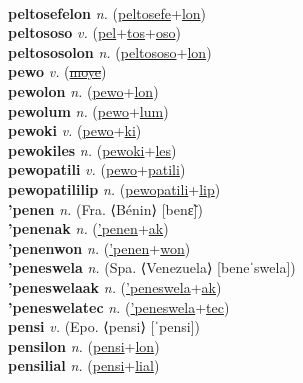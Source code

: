  \label{peltosefe} \\
\textbf{peltosefelon} \textit{n.} (\hyperref[peltosefe]{peltosefe}+\hyperref[lon]{lon})
 \label{peltosefelon} \\
\textbf{peltososo} \textit{v.} (\hyperref[pel]{pel}+\hyperref[tos]{tos}+\hyperref[oso]{oso})
 \label{peltososo} \\
\textbf{peltososolon} \textit{n.} (\hyperref[peltososo]{peltososo}+\hyperref[lon]{lon})
 \label{peltososolon} \\
\textbf{pewo} \textit{v.} (\hyperref[moye]{\sout{moye}})
 \label{pewo} \\
\textbf{pewolon} \textit{n.} (\hyperref[pewo]{pewo}+\hyperref[lon]{lon})
 \label{pewolon} \\
\textbf{pewolum} \textit{n.} (\hyperref[pewo]{pewo}+\hyperref[lum]{lum})
 \label{pewolum} \\
\textbf{pewoki} \textit{v.} (\hyperref[pewo]{pewo}+\hyperref[ki]{ki})
 \label{pewoki} \\
\textbf{pewokiles} \textit{n.} (\hyperref[pewoki]{pewoki}+\hyperref[les]{les})
 \label{pewokiles} \\
\textbf{pewopatili} \textit{v.} (\hyperref[pewo]{pewo}+\hyperref[patili]{patili})
 \label{pewopatili} \\
\textbf{pewopatililip} \textit{n.} (\hyperref[pewopatili]{pewopatili}+\hyperref[lip]{lip})
 \label{pewopatililip} \\
\textbf{'penen} \textit{n.} (Fra. ⟨Bénin⟩ [benɛ̃])
 \label{'penen} \\
\textbf{'penenak} \textit{n.} (\hyperref['penen]{'penen}+\hyperref[ak]{ak})
 \label{'penenak} \\
\textbf{'penenwon} \textit{n.} (\hyperref['penen]{'penen}+\hyperref[won]{won})
 \label{'penenwon} \\
\textbf{'peneswela} \textit{n.} (Spa. ⟨Venezuela⟩ [beneˈswela])
 \label{'peneswela} \\
\textbf{'peneswelaak} \textit{n.} (\hyperref['peneswela]{'peneswela}+\hyperref[ak]{ak})
 \label{'peneswelaak} \\
\textbf{'peneswelatec} \textit{n.} (\hyperref['peneswela]{'peneswela}+\hyperref[tec]{tec})
 \label{'peneswelatec} \\
\textbf{pensi} \textit{v.} (Epo. ⟨pensi⟩ [ˈpensi])
 \label{pensi} \\
\textbf{pensilon} \textit{n.} (\hyperref[pensi]{pensi}+\hyperref[lon]{lon})
 \label{pensilon} \\
\textbf{pensilial} \textit{n.} (\hyperref[pensi]{pensi}+\hyperref[lial]{lial})
